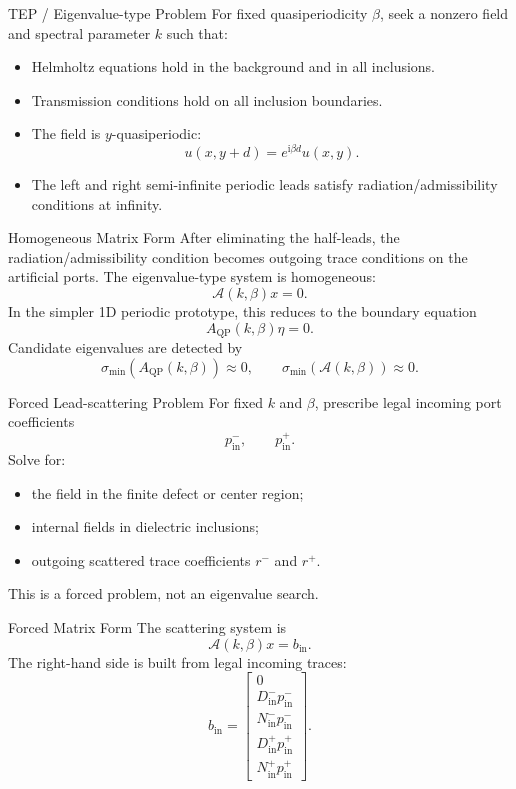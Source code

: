 \documentclass[aspectratio=169]{beamer}
\newcommand{\ii}{\mathrm{i}}
\begin{document}
\begin{frame}{TEP / Eigenvalue-type Problem}
  For fixed quasiperiodicity \(\beta\), seek a nonzero field and spectral parameter \(k\) such that:
  \begin{itemize}
    \item Helmholtz equations hold in the background and in all inclusions.
    \item Transmission conditions hold on all inclusion boundaries.
    \item The field is \(y\)-quasiperiodic:
    \[
      u(x,y+d)=e^{\ii\beta d}u(x,y).
    \]
    \item The left and right semi-infinite periodic leads satisfy radiation/admissibility conditions at infinity.
  \end{itemize}
\end{frame}

\begin{frame}{Homogeneous Matrix Form}
  After eliminating the half-leads, the radiation/admissibility condition becomes outgoing trace conditions on the artificial ports.
  The eigenvalue-type system is homogeneous:
  \[
    \mathcal A(k,\beta)x=0.
  \]
  In the simpler 1D periodic prototype, this reduces to the boundary equation
  \[
    A_{\mathrm{QP}}(k,\beta)\eta=0.
  \]
  Candidate eigenvalues are detected by
  \[
    \sigma_{\min}(A_{\mathrm{QP}}(k,\beta))\approx 0,
    \qquad
    \sigma_{\min}(\mathcal A(k,\beta))\approx 0.
  \]
\end{frame}

\begin{frame}{Forced Lead-scattering Problem}
  For fixed \(k\) and \(\beta\), prescribe legal incoming port coefficients
  \[
    p_{\mathrm{in}}^-,
    \qquad
    p_{\mathrm{in}}^+.
  \]
  Solve for:
  \begin{itemize}
    \item the field in the finite defect or center region;
    \item internal fields in dielectric inclusions;
    \item outgoing scattered trace coefficients \(r^-\) and \(r^+\).
  \end{itemize}
  This is a forced problem, not an eigenvalue search.
\end{frame}

\begin{frame}{Forced Matrix Form}
  The scattering system is
  \[
    \mathcal A(k,\beta)x=b_{\mathrm{in}}.
  \]
  The right-hand side is built from legal incoming traces:
  \[
    b_{\mathrm{in}}
    =
    \begin{bmatrix}
      0\\
      D_{\mathrm{in}}^-p_{\mathrm{in}}^-\\
      N_{\mathrm{in}}^-p_{\mathrm{in}}^-\\
      D_{\mathrm{in}}^+p_{\mathrm{in}}^+\\
      N_{\mathrm{in}}^+p_{\mathrm{in}}^+
    \end{bmatrix}.
  \]
\end{frame}
\end{document}
